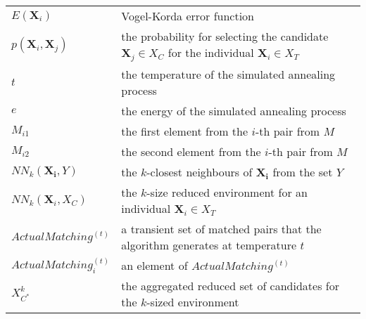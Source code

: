 \begin{tabular}{lp{10cm}}
	$E(\textbf{X}_i)$              & Vogel-Korda error function                                                                                   \\
	$p(\textbf{X}_i,\textbf{X}_j)$ & the probability for selecting the candidate $\textbf{X}_j \in X_C$ for the individual $\textbf{X}_i \in X_T$ \\
	$t$                            & the temperature of the simulated annealing process                                                           \\
	$e$                            & the energy of the simulated annealing process                                                                \\
	$M_{i1}$                       & the first element from the $i$-th pair from $M$                                                              \\
	$M_{i2}$                       & the second element from the $i$-th pair from $M$                                                             \\
	$NN_k(\mathbf{X_i},Y)$         & the $k$-closest neighbours of $\mathbf{X_i}$ from the set $Y$                                                \\
	$NN_k (\mathbf{X}_i,X_C)$      & the $k$-size reduced environment for an individual $\mathbf{X}_i \in X_T$                                    \\
	$ActualMatching^{(t)}$         & a transient set of matched pairs that the algorithm generates at temperature $t$                             \\
	$ActualMatching_i^{(t)}$       & an element of $ActualMatching^{(t)}$                                                                         \\ 
	$X_{C^*}^{k}$                  & the aggregated reduced set of candidates for the $k$-sized environment                                       \\

\end{tabular}
